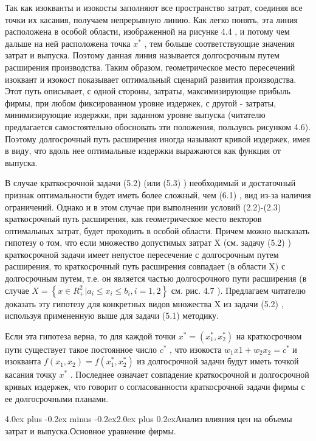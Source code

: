 \documentclass[12pt, 4paper]{book}
\makeatletter
\renewcommand{\section}{\@startsection{section}{1}{1pt}%
	{4.0ex plus -0.2ex minus -0.2ex}{2.0ex plus 0.2ex}{\centering\bf}}%
\makeatother
\begin{document}
{Так как изокванты и изокосты заполняют все пространство затрат, соединяя все точки их касания, получаем непрерывную линию. Как легко понять, эта линия расположена в особой области, изображенной на рисунке 4.4 , и потому чем дальше на ней расположена точка $x^{*}$ , тем больше соответствующие значения затрат и выпуска. Поэтому данная линия называется долгосрочным путем расширения производства. Таким образом, геометрическое место пересечений изоквант и изокост показывает оптимальный сценарий развития производства. Этот путь описывает, с одной стороны, затраты, максимизирующие прибыль фирмы, при любом фиксированном уровне издержек, с другой - затраты, минимизирующие издержки, при заданном уровне выпуска (читателю предлагается самостоятельно обосновать эти положения, пользуясь рисунком 4.6). Поэтому долгосрочный путь расширения иногда называют кривой издержек, имея в виду, что вдоль нее оптимальные издержки выражаются как функция от выпуска. 
\par

В случае краткосрочной задачи (5.2) (или (5.3) ) необходимый и достаточный признак оптимальности будет иметь более сложный, чем (6.1) , вид из-за наличия ограничений. Однако и в этом случае при выполнении условий (2.2)-(2.3) краткосрочный путь расширения, как геометрическое место векторов оптимальных затрат, будет проходить в особой области. Причем можно высказать гипотезу о том, что если множество допустимых затрат X (см. задачу (5.2) ) краткосрочной задачи имеет непустое пересечение с долгосрочным путем расширения, то краткосрочный путь расширения совпадает (в области X) с долгосрочным путем, т.е. он является частью долгосрочного пути расширения (в случае $X = \left\{x \in R_{+}^{2}|a_i \leq x_i \leq b_i, i=1,2 \right\}$ см. рис. 4.7 ). Предлагаем читателю доказать эту гипотезу для конкретных видов множества X из задачи (5.2) , используя примененную выше для задачи (5.1) методику. 
\par

Если эта гипотеза верна, то для каждой точки $x^{*}=(x_{1}^{*},x_{2}^{*})$ на краткосрочном пути существует такое постоянное число $c^{*}$ , что изокоста $w_1 x1 + w_2 x_2 = c^{*}$ и изокванта $f(x_1,x_2)=f(x_{1}^{*},x_{2}^{*}) $ из долгосрочной задачи будут иметь точкой касания точку $x^{*}$ . Последнее означает совпадение краткосрочной и долгосрочной кривых издержек, что говорит о согласованности краткосрочной задачи фирмы с ее долгосрочными планами. 
\newpage
\begin{center}
\section{Анализ влияния цен на объемы затрат и выпуска.Основное уравнение фирмы.}
\end{center}
\par

}
\end{document}
